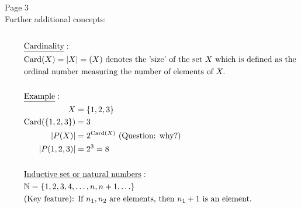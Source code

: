 \documentclass{article}
\begin{document}
\newpage

\begin{flushleft}
    Page 3 \\
    \vspace{1em}
    Further additional concepts: 
    \begin{align*}
        \hspace{2em}&\vspace{0em} \\
        \hspace{2em}&\underline{\text{Cardinality}}: \\
        \hspace{2em}&\text{Card}(X) = |X| = (X) \text{ denotes the 'size' of the set } X \text{ which is defined as the} \\
        \hspace{2em}&\text{ordinal number measuring the number of elements of } X. \\
        \hspace{2em}&\vspace{1em} \\
        \hspace{2em}&\underline{\text{Example}}: \\
        \hspace{2em}&\begin{aligned}
        X &= \{ 1,2,3 \} \\
        \text{Card}(\{1,2,3\}) &= 3 \\
        |P(X)| &= 2^{\text{Card}(X)} \text{ (Question: why?)} \\
        |P({1,2,3})| &= 2^3 = 8
        \end{aligned} \\
        \hspace{2em}&\vspace{1em} \\
        \hspace{2em}&\underline{\text{Inductive set or natural numbers}}: \\
        \hspace{2em}&\mathbb{N} = \{1,2,3,4,\ldots,n, n+1, \ldots\} \\
        \hspace{2em}&\text{(Key feature): If } n_1, n_2 \text{ are elements, then } n_1 + 1 \text{ is an element.}
        \end{align*}
    \end{flushleft}
\end{document}
